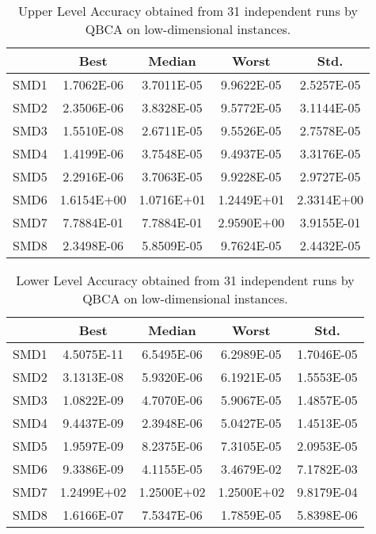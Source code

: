 \documentclass[conference]{IEEEtran}
\theoremstyle{definition}
\begin{document}
\begin{table}[htb]
    \caption{Upper Level Accuracy obtained from 31 independent runs by QBCA on low-dimensional instances.}
    \label{tab:ul-accur-5}
    \centering
    \begin{tabular}{ccccc}
        \hline
             & Best &  Median  &  Worst &  Std. \\ \hline
        SMD1 & 1.7062E-06 & 3.7011E-05 & 9.9622E-05 & 2.5257E-05 \\ \hline 
        SMD2 & 2.3506E-06 & 3.8328E-05 & 9.5772E-05 & 3.1144E-05 \\ \hline 
        SMD3 & 1.5510E-08 & 2.6711E-05 & 9.5526E-05 & 2.7578E-05 \\ \hline 
        SMD4 & 1.4199E-06 & 3.7548E-05 & 9.4937E-05 & 3.3176E-05 \\ \hline 
        SMD5 & 2.2916E-06 & 3.7063E-05 & 9.9228E-05 & 2.9727E-05 \\ \hline 
        SMD6 & 1.6154E+00 & 1.0716E+01 & 1.2449E+01 & 2.3314E+00 \\ \hline 
        SMD7 & 7.7884E-01 & 7.7884E-01 & 2.9590E+00 & 3.9155E-01 \\ \hline 
        SMD8 & 2.3498E-06 & 5.8509E-05 & 9.7624E-05 & 2.4432E-05 \\ \hline 
 
    \end{tabular}
\end{table}
% 
\begin{table}[htb]
    \caption{Lower Level Accuracy obtained from 31 independent runs by QBCA on low-dimensional instances.}
    \label{tab:ll-accur-5}
    \centering
    \begin{tabular}{ccccc}
        \hline
             & Best &  Median  &  Worst &  Std. \\ \hline
        SMD1 & 4.5075E-11 & 6.5495E-06 & 6.2989E-05 & 1.7046E-05 \\ \hline 
        SMD2 & 3.1313E-08 & 5.9320E-06 & 6.1921E-05 & 1.5553E-05 \\ \hline 
        SMD3 & 1.0822E-09 & 4.7070E-06 & 5.9067E-05 & 1.4857E-05 \\ \hline 
        SMD4 & 9.4437E-09 & 2.3948E-06 & 5.0427E-05 & 1.4513E-05 \\ \hline 
        SMD5 & 1.9597E-09 & 8.2375E-06 & 7.3105E-05 & 2.0953E-05 \\ \hline 
        SMD6 & 9.3386E-09 & 4.1155E-05 & 3.4679E-02 & 7.1782E-03 \\ \hline 
        SMD7 & 1.2499E+02 & 1.2500E+02 & 1.2500E+02 & 9.8179E-04 \\ \hline 
        SMD8 & 1.6166E-07 & 7.5347E-06 & 1.7859E-05 & 5.8398E-06 \\ \hline 

    \end{tabular}
\end{table}
\end{document}
